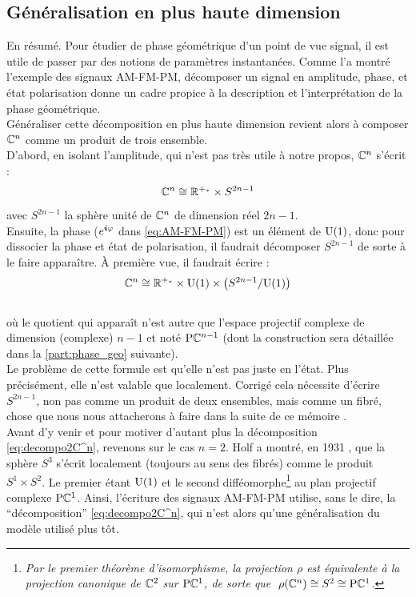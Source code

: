 \subsection{Généralisation en plus haute dimension} \label{subsec:aller_plus_loin}

En résumé. Pour étudier de phase géométrique d'un point de vue signal, il est utile de passer par des notions de paramètres instantanées. Comme l'a montré l'exemple des signaux AM-FM-PM, décomposer un signal en amplitude, phase, et état polarisation donne un cadre propice à la description et l'interprétation de la phase géométrique.
\\

Généraliser cette décomposition en plus haute dimension revient alors à composer $\mathbb{C}^n$ comme un produit de trois ensemble. 
\\
D'abord, en isolant l'amplitude, qui n'est pas très utile à notre propos, $\mathbb{C}^n$ s'écrit :
\[\mathbb{C}^n \cong \mathbb{R}^{+_*} \times S^{2n-1}\]
avec $S^{2n-1}$ la sphère unité de $\mathbb{C}^n$ de dimension réel $2n-1$.
\\
Ensuite, la phase ($e^{\boldsymbol{i} \varphi}$ dans \eqref{eq:AM-FM-PM}) est un élément de $\text{\normalfont U}(1)$, donc pour dissocier la phase et état de polarisation, il faudrait décomposer $S^{2n-1}$ de sorte à le faire apparaître. À première vue, il faudrait écrire :
\begin{equation}\label{eq:decompo2C^n}
	\mathbb{C}^n \cong \mathbb{R}^{+_*} \times \text{\normalfont U}(1) \times \big( S^{2n-1}/\text{\normalfont U}(1) \big)
\end{equation}
\\
où le quotient qui apparaît n'est autre que l'espace projectif complexe de dimension (complexe) $n-1$ et noté $\text{\normalfont P}\mathbb{C}^{n-1}$ (dont la construction sera détaillée dans la \cref{part:phase_geo} suivante).
\\
Le problème de cette formule est qu'elle n'est pas juste en l'état. Plus précisément, elle n'est valable que localement. 
Corrigé cela nécessite d'écrire $S^{2n-1}$, non pas comme un produit de deux ensembles, mais comme un fibré, chose que nous nous attacherons à faire dans la suite de ce mémoire .
\\

Avant d'y venir et pour motiver d'autant plus la décomposition \eqref{eq:decompo2C^n}, revenons sur le cas $n=2$. Holf a montré, en 1931 \cite{hopf_uber_1931}, que la sphère $S^3$ s'écrit localement (toujours au sens des fibrés) comme le produit $S^1\times S^2$. Le premier étant $\text{\normalfont U}(1)$ et le second difféomorphe\footnote{\itshape
	Par le premier théorème d'isomorphisme, la projection $\rho$ est équivalente à la projection canonique de $\mathbb{C}^2$ sur $\text{\normalfont P}\mathbb{C}^{1}$, de sorte que $\ \rho(\mathbb{C}^n)\cong S^2\cong \text{\normalfont P}\mathbb{C}^{1}$.} au plan projectif complexe $\text{\normalfont P}\mathbb{C}^{1}$.
Ainsi, l'écriture des signaux AM-FM-PM utilise, sans le dire, la ``décomposition'' \eqref{eq:decompo2C^n}, qui n'est alors qu'une généralisation du modèle utilisé plus tôt.
